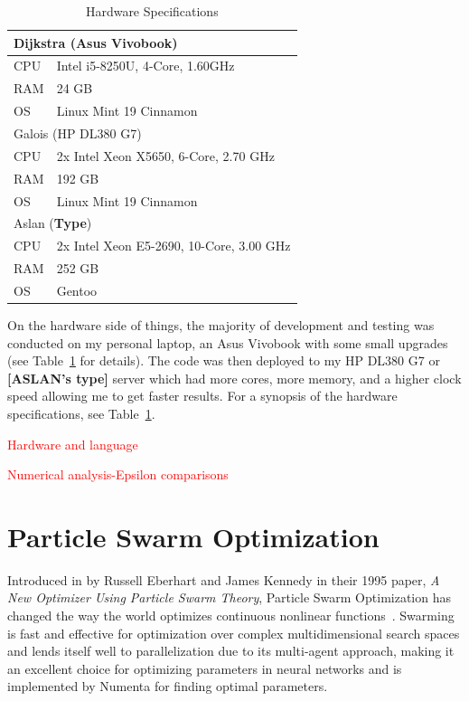 \documentclass[oneside,12pt,openany]{book}
\begin{document}
	\begin{table}[h!]
		\centering
		\begin{tabular}{|l|l|}
			\hline
			\multicolumn{2}{|l|}{Dijkstra (Asus Vivobook)} \\ \hline
			CPU     & Intel i5-8250U, 4-Core, 1.60GHz     \\ \hline
			RAM     & 24 GB                                \\ \hline
			OS      & Linux Mint 19 Cinnamon               \\ \hline
			\multicolumn{2}{|l|}{Galois (HP DL380 G7)}     \\ \hline
			CPU     &  2x Intel Xeon X5650, 6-Core, 2.70 GHz       \\ \hline
			RAM     & 192 GB                               \\ \hline
			OS      & Linux Mint 19 Cinnamon               \\ \hline
			\multicolumn{2}{|l|}{Aslan (\textbf{Type})}                         \\ \hline
			CPU&    2x  Intel Xeon E5-2690, 10-Core, 3.00 GHz    \\ \hline
			RAM&    252 GB                                  \\ \hline
			OS&    Gentoo                               \\ \hline
		\end{tabular}
		\caption{Hardware Specifications}
		\label{tab:hardware}
	\end{table}

	On the hardware side of things, the majority of development and testing was conducted on my personal laptop, an Asus Vivobook with some small upgrades (see Table~\ref{tab:hardware} for details). The code was then deployed to my HP DL380 G7 or \textbf{[ASLAN's type]} server which had more cores, more memory, and a higher clock speed allowing me to get faster results. For a synopsis of the hardware specifications, see Table~\ref{tab:hardware}. 
	
	\textcolor{red}{Hardware and language}
	
	\textcolor{red}{Numerical analysis-Epsilon comparisons}
	
	\section{Particle Swarm Optimization}
	
	Introduced in by Russell Eberhart and James Kennedy in their 1995 paper, \textit{A New Optimizer Using Particle Swarm Theory}, Particle Swarm Optimization has changed the way the world optimizes continuous nonlinear functions~\cite{PSOReview}. Swarming is fast and effective for optimization over complex multidimensional search spaces and lends itself well to parallelization due to its multi-agent approach, making it an excellent choice for optimizing parameters in neural networks and is implemented by Numenta for finding optimal parameters.
	
\end{document}
